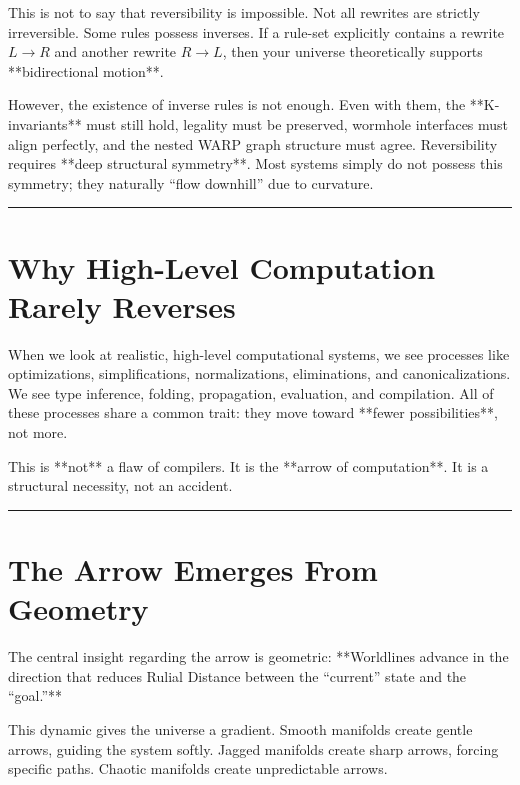 This is not to say that reversibility is impossible. Not all rewrites are strictly irreversible. Some rules possess inverses. If a rule-set explicitly contains a rewrite $L \rightarrow R$ and another rewrite $R \rightarrow L$, then your universe theoretically supports **bidirectional motion**.

However, the existence of inverse rules is not enough. Even with them, the **K-invariants** must still hold, legality must be preserved, wormhole interfaces must align perfectly, and the nested WARP graph structure must agree. Reversibility requires **deep structural symmetry**. Most systems simply do not possess this symmetry; they naturally ``flow downhill'' due to curvature.

\begin{center}\rule{0.5\linewidth}{0.5pt}\end{center}

\section{\texorpdfstring{\textbf{Why High-Level Computation Rarely Reverses}}{14.5 --- Why High-Level Computation Rarely Reverses}}

When we look at realistic, high-level computational systems, we see processes like optimizations, simplifications, normalizations, eliminations, and canonicalizations. We see type inference, folding, propagation, evaluation, and compilation. All of these processes share a common trait: they move toward **fewer possibilities**, not more.

This is **not** a flaw of compilers. It is the **arrow of computation**. It is a structural necessity, not an accident.

\begin{center}\rule{0.5\linewidth}{0.5pt}\end{center}

\section{\texorpdfstring{\textbf{The Arrow Emerges From Geometry}}{14.6 --- The Arrow Emerges From Geometry}}

The central insight regarding the arrow is geometric: **Worldlines advance in the direction that reduces Rulial Distance between the ``current'' state and the ``goal.''**

This dynamic gives the universe a gradient. Smooth manifolds create gentle arrows, guiding the system softly. Jagged manifolds create sharp arrows, forcing specific paths. Chaotic manifolds create unpredictable arrows.

